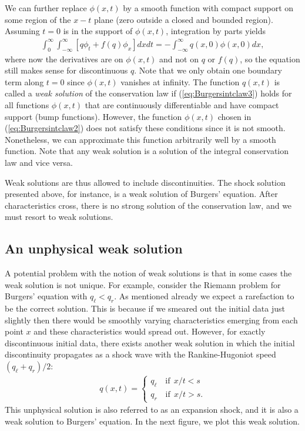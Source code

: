 \documentclass{SIAMbook2016}
\begin{document}
We can further replace \(\phi(x,t)\) by a smooth function with compact
support on some region of the \(x-t\) plane (zero outside a closed and
bounded region). Assuming \(t=0\) is in the support of \(\phi(x,t)\),
integration by parts yields \begin{align}
\int_{0}^{\infty}\int_{-\infty}^{\infty} [q\phi_t+f(q)\phi_x] dx dt = -\int_{-\infty}^{\infty}q(x,0)\phi(x,0)dx,
\label{eq:Burgersintclaw3}
\end{align} where now the derivatives are on \(\phi(x,t)\) and not on
\(q\) or \(f(q)\), so the equation still makes sense for discontinuous
\(q\). Note that we only obtain one boundary term along \(t=0\) since
\(\phi(x,t)\) vanishes at infinity. The function \(q(x,t)\) is called a
\emph{weak solution} of the conservation law if
(\ref{eq:Burgersintclaw3}) holds for all functions \(\phi(x,t)\) that
are continuously differentiable and have compact support (bump
functions). However, the function \(\phi(x,t)\) chosen in
(\ref{eq:Burgersintclaw2}) does not satisfy these conditions since it is
not smooth. Nonetheless, we can approximate this function arbitrarily
well by a smooth function. Note that any weak solution is a solution of
the integral conservation law and vice versa.

Weak solutions are thus allowed to include discontinuities. The shock
solution presented above, for instance, is a weak solution of Burgers'
equation. After characteristics cross, there is no strong solution of
the conservation law, and we must resort to weak solutions.

\hypertarget{an-unphysical-weak-solution}{%
\subsection{An unphysical weak
solution}\label{an-unphysical-weak-solution}}

A potential problem with the notion of weak solutions is that in some
cases the weak solution is not unique. For example, consider the Riemann
problem for Burgers' equation with \(q_\ell < q_r\). As mentioned
already we expect a rarefaction to be the correct solution. This is
because if we smeared out the initial data just slightly then there
would be smoothly varying characteristics emerging from each point \(x\)
and these characteristics would spread out. However, for exactly
discontinuous initial data, there exists another weak solution in which
the initial discontinuity propagates as a shock wave with the
Rankine-Hugoniot speed \((q_\ell + q_r)/2\): \begin{align*}
q(x,t) = 
\begin{cases}
q_\ell \quad \text{if} \ \ x/t<s \\
q_r \quad \text{if} \ \ x/t>s.
\end{cases}
\end{align*} This unphysical solution is also referred to as an
expansion shock, and it is also a weak solution to Burgers' equation. In
the next figure, we plot this weak solution.
\end{document}
